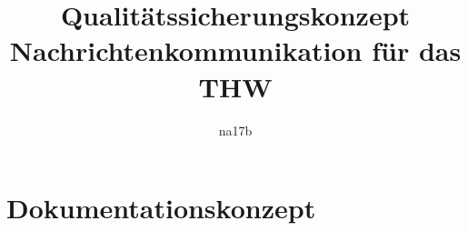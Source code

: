 \documentclass[a4paper,11pt,oneside, titlepage]{article}
\title{Qualitätssicherungskonzept\\Nachrichtenkommunikation für das THW}
\author{na17b}
\date{}
\begin{document}
\maketitle


\tableofcontents


\newpage


\section{Dokumentationskonzept}






\end{document}
